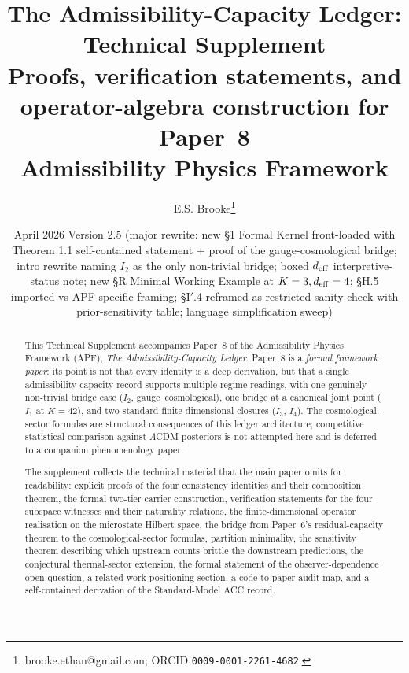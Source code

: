 \documentclass[11pt]{article}
\title{\textbf{The Admissibility-Capacity Ledger: Technical Supplement}\\[0.4em]
\large Proofs, verification statements, and operator-algebra construction for Paper~8\\[0.6em]
\normalsize Admissibility Physics Framework}
\author{E.S. Brooke\thanks{brooke.ethan@gmail.com; ORCID \texttt{0009-0001-2261-4682}.}}
\date{April 2026 \quad\textbar\quad Version 2.5 (major rewrite: new §1 Formal Kernel front-loaded with Theorem 1.1 self-contained statement + proof of the gauge-cosmological bridge; intro rewrite naming $I_2$ as the only non-trivial bridge; boxed $d_{\rm eff}$ interpretive-status note; new §R Minimal Working Example at $K=3, d_{\rm eff}=4$; §H.5 imported-vs-APF-specific framing; §I$'$.4 reframed as restricted sanity check with prior-sensitivity table; language simplification sweep)}
\theoremstyle{plain}
\theoremstyle{definition}
\theoremstyle{remark}
\begin{document}
\maketitle

\begin{abstract}
\noindent This Technical Supplement accompanies Paper~8 of the Admissibility Physics Framework (APF), \emph{The Admissibility-Capacity Ledger}.  Paper~8 is a \emph{formal framework paper}: its point is not that every identity is a deep derivation, but that a single admissibility-capacity record supports multiple regime readings, with one genuinely non-trivial bridge case ($I_2$, gauge--cosmological), one bridge at a canonical joint point ($I_1$ at $K = 42$), and two standard finite-dimensional closures ($I_3$, $I_4$).  The cosmological-sector formulas are structural consequences of this ledger architecture; competitive statistical comparison against $\Lambda$CDM posteriors is not attempted here and is deferred to a companion phenomenology paper.

The supplement collects the technical material that the main paper omits for readability: explicit proofs of the four consistency identities and their composition theorem, the formal two-tier carrier construction, verification statements for the four subspace witnesses and their naturality relations, the finite-dimensional operator realisation on the microstate Hilbert space, the bridge from Paper~6's residual-capacity theorem to the cosmological-sector formulas, partition minimality, the sensitivity theorem describing which upstream counts brittle the downstream predictions, the conjectural thermal-sector extension, the formal statement of the observer-dependence open question, a related-work positioning section, a code-to-paper audit map, and a self-contained derivation of the Standard-Model ACC record.


\end{abstract}
\end{document}
